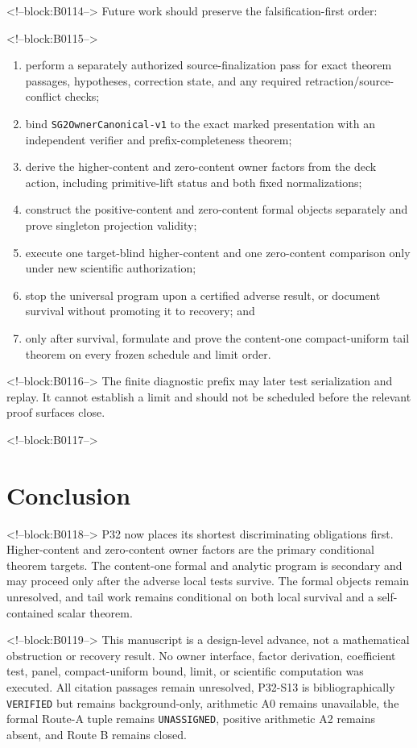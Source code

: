 \documentclass[11pt]{article}
\providecommand{\tightlist}{\setlength{\itemsep}{0pt}\setlength{\parskip}{0pt}}
\begin{document}
<!--block:B0114-->
Future work should preserve the falsification-first order:

<!--block:B0115-->
\begin{enumerate}
\def\labelenumi{\arabic{enumi}.}
\tightlist
\item
  perform a separately authorized source-finalization pass for exact
  theorem passages, hypotheses, correction state, and any required
  retraction/source-conflict checks;
\item
  bind \texttt{SG2OwnerCanonical-v1} to the exact marked presentation
  with an independent verifier and prefix-completeness theorem;
\item
  derive the higher-content and zero-content owner factors from the deck
  action, including primitive-lift status and both fixed normalizations;
\item
  construct the positive-content and zero-content formal objects
  separately and prove singleton projection validity;
\item
  execute one target-blind higher-content and one zero-content
  comparison only under new scientific authorization;
\item
  stop the universal program upon a certified adverse result, or
  document survival without promoting it to recovery; and
\item
  only after survival, formulate and prove the content-one
  compact-uniform tail theorem on every frozen schedule and limit order.
\end{enumerate}

<!--block:B0116-->
The finite diagnostic prefix may later test serialization and replay. It
cannot establish a limit and should not be scheduled before the relevant
proof surfaces close.

<!--block:B0117-->
\hypertarget{10-conclusion}{%
\section{Conclusion}\label{10-conclusion}}

<!--block:B0118-->
P32 now places its shortest discriminating obligations first.
Higher-content and zero-content owner factors are the primary
conditional theorem targets. The content-one formal and analytic program
is secondary and may proceed only after the adverse local tests survive.
The formal objects remain unresolved, and tail work remains conditional
on both local survival and a self-contained scalar theorem.

<!--block:B0119-->
This manuscript is a design-level advance, not a mathematical obstruction
or recovery result. No owner interface, factor derivation, coefficient
test, panel, compact-uniform bound, limit, or scientific computation was
executed. All citation passages remain unresolved, P32-S13 is
bibliographically \texttt{VERIFIED} but remains background-only, arithmetic A0 remains
unavailable, the formal Route-A tuple remains \texttt{UNASSIGNED},
positive arithmetic A2 remains absent, and Route B remains closed.
\end{document}
